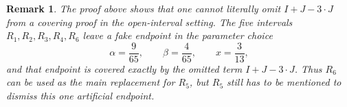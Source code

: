 \documentclass{article}
\newtheorem{remark}{Remark}
\def\IntervalProjectEnd{\end{document}}
\begin{document}
\begin{remark}
The proof above shows that one cannot literally omit $I+J-3\cdot J$ from a covering
proof in the open-interval setting. The five intervals $R_1,R_2,R_3,R_4,R_6$ leave a fake
endpoint in the parameter choice
\[
    \alpha=\frac9{65}, \qquad \beta=\frac4{65}, \qquad x=\frac3{13},
\]
and that endpoint is covered exactly by the omitted term $I+J-3\cdot J$. Thus $R_6$ can
be used as the main replacement for $R_5$, but $R_5$ still has to be mentioned to dismiss
this one artificial endpoint.
\end{remark}

\IntervalProjectEnd
\end{document}
